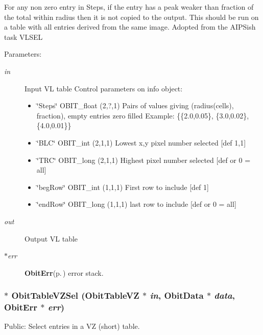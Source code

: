 For any non zero entry in Steps, if the entry has a peak weaker than fraction of the total within radius then it is not copied to the output. This should be run on a table with all entries derived from the same image. Adopted from the AIPSish task VLSEL \begin{Desc}
\item[Parameters:]
\begin{description}
\item[{\em in}]Input VL table Control parameters on info object: \begin{itemize}
\item \char`\"{}Steps\char`\"{} OBIT\_\-float (2,?,1) Pairs of values giving (radius(cells), fraction), empty entries zero filled Example: \{\{2.0,0.05\}, \{3.0,0.02\}, \{4.0,0.01\}\} \item \char`\"{}BLC\char`\"{} OBIT\_\-int (2,1,1) Lowest x,y pixel number selected [def 1,1] \item \char`\"{}TRC\char`\"{} OBIT\_\-long (2,1,1) Highest pixel number selected [def or 0 = all] \item \char`\"{}beg\-Row\char`\"{} OBIT\_\-int (1,1,1) First row to include [def 1] \item \char`\"{}end\-Row\char`\"{} OBIT\_\-long (1,1,1) last row to include [def or 0 = all] \end{itemize}
\item[{\em out}]Output VL table \item[{\em $\ast$err}]{\bf Obit\-Err}{\rm (p.\,\pageref{structObitErr})} error stack. \end{description}
\end{Desc}
\subsubsection{$\ast$ Obit\-Table\-VZSel ({\bf Obit\-Table\-VZ} $\ast$ {\em in}, {\bf Obit\-Data} $\ast$ {\em data}, {\bf Obit\-Err} $\ast$ {\em err})}\label{ObitTableVLUtil_8c_a11}


Public: Select entries in a VZ (short) table. 

